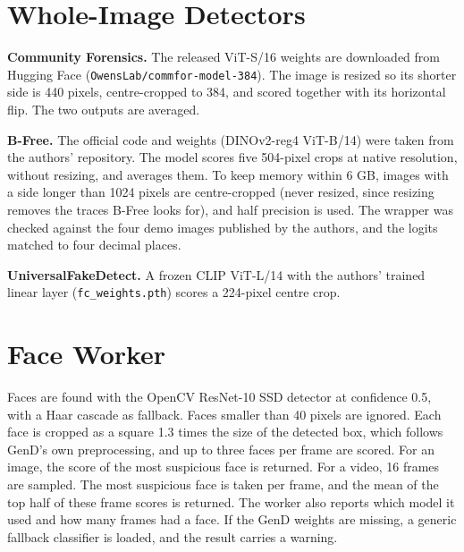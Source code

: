 \documentclass[12pt,a4paper,oneside]{report}
\begin{document}
\section{Whole-Image Detectors}
\textbf{Community Forensics.} The released ViT-S/16 weights are downloaded from Hugging Face (\texttt{OwensLab/commfor-model-384}). The image is resized so its shorter side is 440 pixels, centre-cropped to 384, and scored together with its horizontal flip. The two outputs are averaged.

\textbf{B-Free.} The official code and weights (DINOv2-reg4 ViT-B/14) were taken from the authors' repository. The model scores five 504-pixel crops at native resolution, without resizing, and averages them. To keep memory within 6 GB, images with a side longer than 1024 pixels are centre-cropped (never resized, since resizing removes the traces B-Free looks for), and half precision is used. The wrapper was checked against the four demo images published by the authors, and the logits matched to four decimal places.

\textbf{UniversalFakeDetect.} A frozen CLIP ViT-L/14 with the authors' trained linear layer (\texttt{fc\_weights.pth}) scores a 224-pixel centre crop.

\section{Face Worker}
Faces are found with the OpenCV ResNet-10 SSD detector\cite{bradski2000} at confidence 0.5, with a Haar cascade as fallback. Faces smaller than 40 pixels are ignored. Each face is cropped as a square 1.3 times the size of the detected box, which follows GenD's own preprocessing, and up to three faces per frame are scored. For an image, the score of the most suspicious face is returned. For a video, 16 frames are sampled. The most suspicious face is taken per frame, and the mean of the top half of these frame scores is returned. The worker also reports which model it used and how many frames had a face. If the GenD weights are missing, a generic fallback classifier is loaded, and the result carries a warning.
\end{document}

